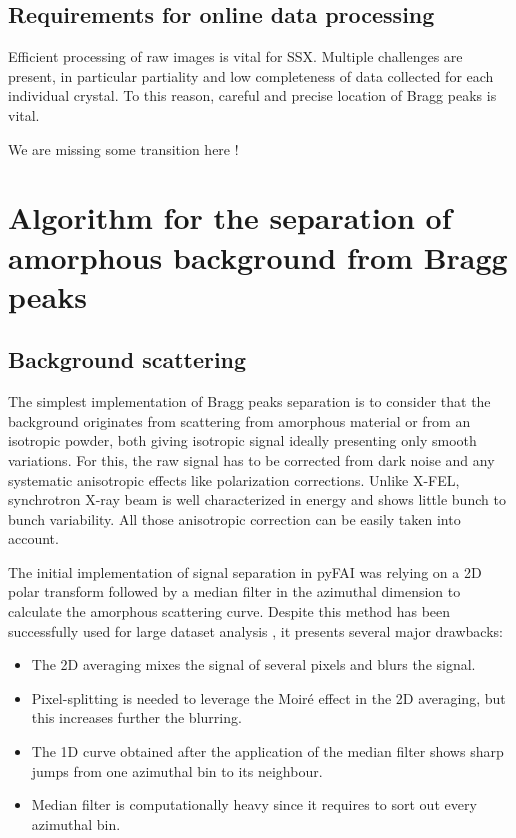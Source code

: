 \documentclass[preprint]{iucr}              %
\begin{document}
\subsection{Requirements for online data processing}
Efficient processing of raw images is vital for SSX.
Multiple challenges are present, in particular partiality and low completeness of data collected for each individual crystal.
To this reason, careful and precise location of Bragg peaks is vital.


We are missing some transition here !

\section{Algorithm for the separation of amorphous background from Bragg peaks}
\subsection{Background scattering}

The simplest implementation of Bragg peaks separation is to consider that the background originates from scattering from amorphous material or from an isotropic powder, both giving isotropic signal ideally presenting only smooth variations.
For this, the raw signal has to be corrected from dark noise and any systematic anisotropic effects like polarization corrections.
Unlike X-FEL, synchrotron X-ray beam is well characterized in energy and shows little bunch to bunch variability. 
All those anisotropic correction can be easily taken into account.

The initial implementation of signal separation in pyFAI \cite{pdj2013} was relying on a 2D polar transform followed by a median filter in the azimuthal dimension to calculate the amorphous scattering curve.
Despite this method has been successfully used for large dataset analysis \cite{brocades}, it presents several major drawbacks:
\begin{itemize}
\item The 2D averaging mixes the signal of several pixels and blurs the signal. 
\item Pixel-splitting is needed to leverage the Moiré effect in the 2D averaging, but this increases further the blurring. 
\item The 1D curve obtained after the application of the median filter shows sharp jumps from one azimuthal bin to its neighbour.
\item Median filter is computationally heavy since it requires to sort out every azimuthal bin.
\end{itemize}
\end{document}
